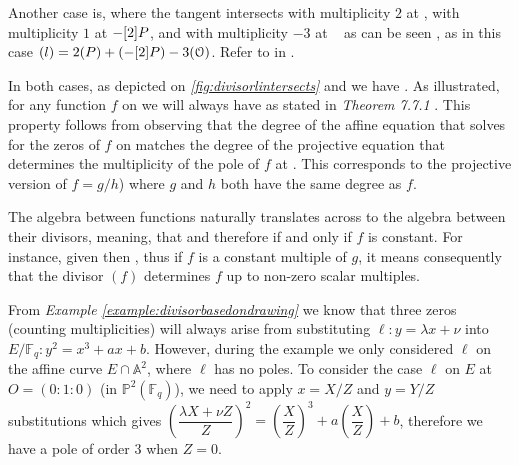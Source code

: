 \begin{example}
Another case is, where the tangent \mathFormulaObject{\ell} intersects  with multiplicity $2$ at , with multiplicity $1$ at $-[2] {P}$, and with multiplicity $-3$ at \mathFormulaEllipticCurvePointAtInfinity~ as can be seen , as in this case $(l)=2(P) + (-[2]P) - 3(\EuScript{O})$.
Refer to  in .
\label{example:divisorlintersectsppointdoubling}
\end{example}





In both cases, as depicted on \textit{\ref{fig:divisorlintersects}} and  we have . 
As illustrated, for any function $f$ on  we will always have  as stated in \textit{Theorem 7.7.1} \cite{Gal12}. This property follows from observing that the degree of the affine equation that solves for the zeros of $f$ on   matches the degree of the projective equation that determines the multiplicity of the pole of $f$ at \mathFormulaEllipticCurvePointAtInfinity. This corresponds to the projective version of $f=g/h$) where $g$ and $h$ both have the same degree as $f$.

The algebra between functions naturally translates across to the algebra between their divisors, meaning, that  and  therefore  
if and only if $f$ is constant.  For instance, given  then , thus if $f$ is a constant multiple of $g$, it  means consequently that the divisor $(f)$ determines $f$ up to non-zero scalar multiples.

\begin{example}
From \textit{Example \ref{example:divisorbasedondrawing}} we know that three zeros (counting multiplicities) will always arise from substituting
$\ell : y = \lambda x + \nu$ into $E/\mathbb{F}_q : y^{2} = x^{3} + ax + b$. However, during the example we only considered $\ell$ on the affine curve $E \cap \mathbb{A}^{2}$, where $\ell$ has no poles.   To consider the case $\ell$ on $E$ at $O = (0 : 1 : 0)$ (in $\mathbb{P}^{2}(\mathbb{F}_q)$), we need to apply $x = X/Z$ and $y = Y/Z$ substitutions which gives $\left(\dfrac{\lambda X + \nu Z}{Z}\right)^2 = \left( \dfrac{X}{Z} \right)^3 + a \left( \dfrac{X}{Z}  \right) + b $, therefore we have a pole of order $3$ when $Z = 0$. 
\label{example:polecountinginprojectivespace}
\end{example}

